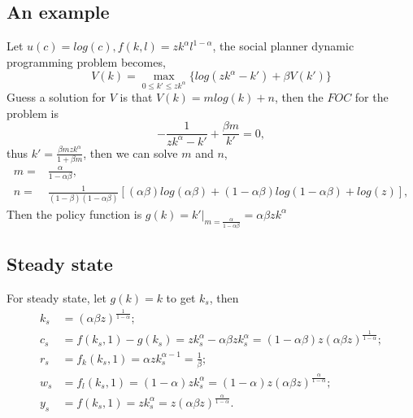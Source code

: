 \documentclass[12pt,notitlepage]{article}%
\numberwithin{equation}{section}
\begin{document}
		\subsection{An example}
			Let $u(c)=log(c), f(k,l)=zk^{\alpha}l^{1-\alpha}$, the social planner dynamic programming problem becomes,
			\begin{equation*}
				V(k)=\max_{0\leq k'\leq zk^{\alpha}} \{log(zk^{\alpha}-k')+\beta V(k')\}
			\end{equation*}
			Guess a solution for $V$ is that $V(k)=mlog(k)+n$, then the $FOC$ for the problem is $$-\frac{1}{zk^{\alpha}-k'}+\frac{\beta m}{k'}=0,$$ thus $k'=\frac{\beta mzk^{\alpha}}{1+\beta m}$, then we can solve $m$ and $n$,
			\begin{equation*}
			\begin{split}
				m=&\frac{\alpha}{1-\alpha \beta},\\
				n=&\frac{1}{(1-\beta)(1-\alpha \beta)}[(\alpha \beta)log(\alpha \beta)+(1-\alpha \beta)log(1-\alpha \beta)+log(z)],
			\end{split}
			\end{equation*}
			Then the policy function is $g(k)=k'|_{m=\frac{\alpha}{1-\alpha \beta}}=\alpha \beta zk^{\alpha}$
		
		\subsection{Steady state}
			For steady state, let $g(k)=k$ to get $k_s$, then
			\begin{equation*}
			\begin{split}
				k_s&=(\alpha \beta z)^{\frac{1}{1-\alpha}};\\
				c_s&=f(k_s,1)-g(k_s)=zk_s^{\alpha}-\alpha \beta zk_s^{\alpha}=(1-\alpha \beta)z(\alpha \beta z)^{\frac{1}{1-\alpha}};\\
				r_s&=f_k(k_s,1)=\alpha zk_s^{\alpha -1}=\frac{1}{\beta};\\
				w_s&=f_l(k_s,1)=(1-\alpha) zk_s^{\alpha}=(1-\alpha) z(\alpha \beta z)^{\frac{\alpha}{1-\alpha}};\\
				y_s&=f(k_s,1)=zk_s^{\alpha}=z(\alpha \beta z)^{\frac{\alpha}{1-\alpha}}.
			\end{split}
			\end{equation*} 
	\setcounter{table}{0}
	
	\bigskip
	
	
	
	
\end{document}
